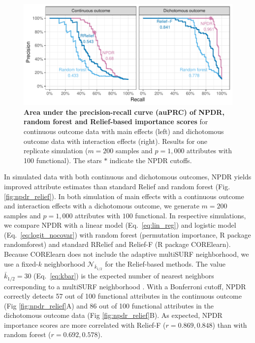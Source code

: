 \documentclass[10pt]{article}
\begin{document}
\begin{figure}[!tbp]
\centerline{\includegraphics[trim = 0 0 0 0]{../figs/fig2_pr_plots.pdf}}
\caption{{\bf Area under the precision-recall curve (auPRC) of NPDR, random forest and Relief-based importance scores} for continuous outcome data with main effects (left) and dichotomous outcome data with interaction effects (right). Results for one replicate simulation ($m = 200$ samples and $p = 1,000$ attributes with 100 functional). The stars $\ast$ indicate the NPDR cutoffs.}
\label{fig:pr_curve}
\end{figure}

In simulated data with both continuous and dichotomous outcomes, NPDR yields improved attribute estimates than standard Relief and random forest (Fig. \ref{fig:npdr_relief}).
In both simulation of main effects with a continuous outcome and interaction effects with a dichotomous outcome, we generate $m = 200$ samples and $p = 1,000$ attributes with $100$ functional.
In respective simulations, we compare NPDR with a linear model (Eq.~\ref{eq:lin_reg}) and logistic model (Eq.~\ref{eq:logit_nocovar}) with random forest (permutation importance, R package randomforest) and standard RRelief and Relief-F (R package CORElearn).
Because CORElearn does not include the adaptive multiSURF neighborhood, we use a fixed-$k$ neighborhood $\mathcal{N}_{\bar{k}_{1/2}}$ for the Relief-based methods.
The value $\bar{k}_{1/2}=30$ (Eq.~\ref{eq:kbar}) is the expected number of nearest neighbors corresponding to a multiSURF neighborhood \cite{bod}. 
With a Bonferroni cutoff, NPDR correctly detects 57 out of 100 functional attributes in the continuous outcome (Fig \ref{fig:npdr_relief}A) and 86 out of 100 functional attributes in the dichotomous outcome data (Fig \ref{fig:npdr_relief}B).
As expected, NPDR importance scores are more correlated with Relief-F ($r = 0.869, 0.848$) than with random forest ($r = 0.692, 0.578$).
\end{document}
